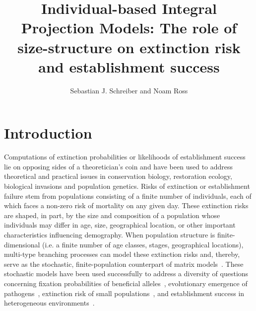 \documentclass[12pt]{amsart}\usepackage[]{graphicx}\usepackage[]{color}
\begin{document}



\title[Extinction in Individual-based IPMs]{Individual-based Integral Projection Models: The role of size-structure on
  extinction risk and establishment success}
\author{Sebastian J. Schreiber and Noam Ross}
\address{Department of Evolution and Ecology, One Shields Avenue, University of California, Davis, California 95616}
\address{Current Address: Department of Environmental Science and Policy, University of California, Davis, California 95616}
\address{Address effective October 1, 2015: EcoHealth Alliance,
460 West 34th Street – 17th floor, New York, NY 10001  }
\maketitle{}

\section*{Introduction}
Computations of extinction probabilities or likelihoods of establishment success lie on opposing sides of a theoretician's coin and have been used to address theoretical and practical issues in conservation biology, restoration ecology, biological invasions and population genetics. Risks of extinction or establishment failure stem from populations consisting of a finite number of individuals, each of which faces a non-zero risk of mortality on any given day. These extinction risks are shaped, in part, by the size and composition of a population whose individuals may differ in age, size, geographical location, or other important characteristics influencing demography. When population structure is finite-dimensional (i.e. a finite number of age classes, stages, geographical locations), multi-type branching processes can model these extinction risks and, thereby, serve as the stochastic, finite-population counterpart of matrix models~\citep{harris-63,athreya-ney-04,caswell-01,haccou-etal-05}. These stochastic models have been used successfully to address a diversity of questions concerning fixation probabilities of beneficial alleles~\citep{patwa-wahl-08}, evolutionary emergence of pathogens~\citep{antia-etal-03,ptrb-13}, extinction risk of small populations~\citep{boyce-92,gosselin-lebreton-00,fujiwara-caswell-01,erickson-etal-15}, and establishment success in heterogeneous environments~\citep{haccou-iwasa-96,haccou-vatunin-03,amnat-09b}.
\end{document}
